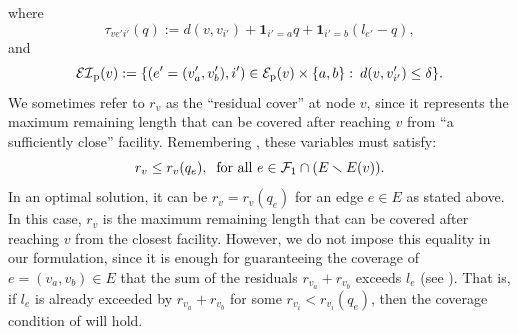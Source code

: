 where $$ \tau_{ve'i'}(q) := d(v,v_{i'})+ \mathbf{1}_{i'=a}q +\mathbf{1}_{i'=b}(l_{e'} - q),$$ and $${\mathcal {EI}}_{\mathrm{p}}(v) := \{(e'=(v'_a,v'_b),i') \in {\mathcal E}_{\mathrm{p}}(v) \times \{a,b\}:\: d(v,v'_{i'})\leq \delta\}.$$ We sometimes refer to $r_v$ as the ``residual cover'' at node $v$, since it represents the maximum remaining length that can be covered after reaching $v$ from ``a sufficiently close'' facility. Remembering , these variables must satisfy:
$$r_v\leq r_v(q_e), \: \textup{ for all } e \in \mathcal F_1 \cap (E \smallsetminus E(v)).$$
In an optimal solution, it can be $r_v=r_v(q_e)$ for an edge $e\in E$ as stated above. In this case, $r_v$ is the maximum remaining length that can be covered after reaching $v$ from the closest facility. However, we do not impose this equality in our formulation, since it is enough for guaranteeing the coverage of $e=(v_a,v_b)\in E$ that the sum of the residuals $r_{v_a}+r_{v_b}$ exceeds $l_e$ (see ). That is, if $l_e$ is already exceeded by $r_{v_a}+r_{v_b}$  for some $r_{v_i} < r_{v_i}(q_e)$, then the coverage condition of  will hold.

